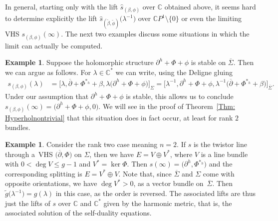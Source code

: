 \documentclass[pdftex]{sigma}
\numberwithin{equation}{section}
\theoremstyle{definition}
\newtheorem{Example}[Theorem]{Example}
\newcommand\C{{\mathbb C}}
\begin{document}
In general, starting only with the lift $\widehat{s}_{(\beta,\phi)}$ over $\C$ obtained above,
it seems hard to determine explicitly the lift
$\widehat{s}_{(\widetilde\beta,\widetilde\phi)}\bigl(\lambda^{-1}\bigr)$ over $\C P^1\setminus\{0\}$ or
even the limiting VHS $s_{(\beta,\phi)}(\infty)$. The next two examples discuss some situations
in which the limit can actually be computed.

\begin{Example}
Suppose the holomorphic structure $\partial^h + \Phi + \phi$ is stable on $\overline{\Sigma}$. Then we can argue as follows. For
$\lambda \in \C^*$ we can write, using the Deligne gluing
\begin{align*}
s_{(\beta,\phi)}(\lambda) &= \big[\lambda,{\overline{\partial}}+\Phi^{*_h}+\beta, \lambda\bigl(\partial^h + \Phi + \phi\bigr)\big]_{\Sigma} = \big[\lambda^{-1},\partial^h + \Phi + \phi,\lambda^{-1}\bigl({\overline{\partial}}+\Phi^{*_h}+\beta\bigr)\big]_{\overline{\Sigma}}.
\end{align*}
Under our assumption that $\partial^h + \Phi + \phi$ is stable, this allows us to conclude $s_{(\beta,\phi)}(\infty)
 = \bigl(\partial^h + \Phi + \phi,0\bigr)$. We will see in the proof of Theorem~\ref{Thm: Hyperholnontrivial} that this situation does in
fact occur, at least for rank $2$ bundles.
\end{Example}

\begin{Example}
Consider the rank two case meaning $n = 2$. If $s$ is the twistor line through a~VHS $\bigl({\overline{\partial}}, \Phi\bigr)$
on $\Sigma$, then we have $E = V \oplus V^*$, where $V$ is a line bundle with $0 < \deg V
 \leq g-1$ and $V^* = \ker\Phi$. Then $s(\infty) = \bigl(\partial^h, \Phi^{*_h}\bigr)$ and the corresponding
splitting is $E = V^*\oplus V$. Note that, since $\overline{\Sigma}$ and $\Sigma$ come with opposite
orientations, we have $\deg V^* > 0$, as a vector bundle on~$\overline{\Sigma}$. Then
$\widetilde g\bigl(\lambda^{-1}\bigr) = g(\lambda)$ in this case, as the order is reversed. The associated lifts
are thus just the lifts of $s$ over $\C$ and $\C^*$ given by the harmonic metric, that is, the associated
solution of the self-duality equations.
\end{Example}
\end{document}
